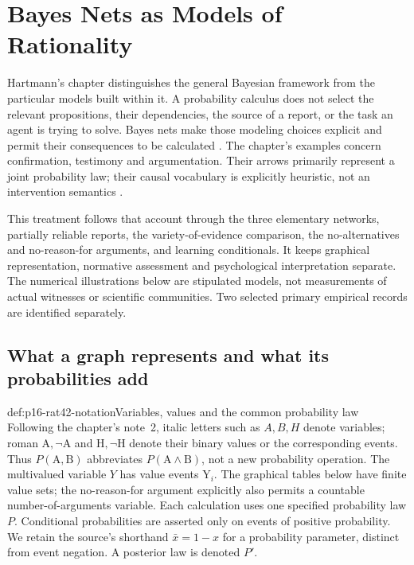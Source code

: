 \chapter{Bayes Nets as Models of Rationality}
\label{sec:p16-rationality-4-2}

Hartmann's chapter distinguishes the general Bayesian framework from
the particular models built within it. A probability calculus does not
select the relevant propositions, their dependencies, the source of a
report, or the task an agent is trying to solve. Bayes nets make those
modeling choices explicit and permit their consequences to be calculated
\cite[chapter~4.2, pp.~253--264]{Hartmann2021BayesNets}.
The chapter's examples concern confirmation, testimony and argumentation.
Their arrows primarily represent a joint probability law; their causal
vocabulary is explicitly heuristic, not an intervention semantics
\cite[note~4, pp.~262--263]{Hartmann2021BayesNets}.

This treatment follows that account through the three elementary networks,
partially reliable reports, the variety-of-evidence comparison, the
no-alternatives and no-reason-for arguments, and learning conditionals.
It keeps graphical representation, normative assessment and psychological
interpretation separate. The numerical illustrations below are stipulated
models, not measurements of actual witnesses or scientific communities.
Two selected primary empirical records are identified separately.

\section{What a graph represents and what its probabilities add}
\label{sec:p16-rat42-graphical-representation}

\begin{hbconvention}{def:p16-rat42-notation}{Variables, values and the common probability law}
Following the chapter's note~2, italic letters such as \(A,B,H\)
denote variables; roman \(\mathrm A,\neg\mathrm A\) and
\(\mathrm H,\neg\mathrm H\) denote their binary values or the
corresponding events. Thus \(P(\mathrm A,\mathrm B)\) abbreviates
\(P(\mathrm A\land\mathrm B)\), not a new probability operation.
The multivalued variable \(Y\) has value events \(\mathrm Y_i\).
The graphical tables below have finite value sets; the no-reason-for
argument explicitly also permits a countable number-of-arguments variable.
Each calculation uses one specified probability law \(P\).
Conditional probabilities are asserted only on
events of positive probability. We retain the source's shorthand
\(\bar x=1-x\) for a probability parameter, distinct from event
negation. A posterior law is denoted \(P'\).
\end{hbconvention}

